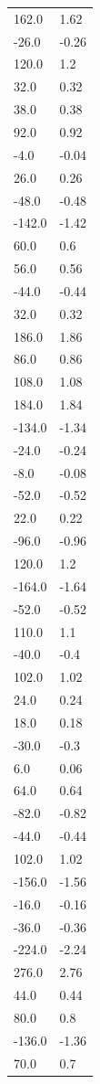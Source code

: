 \begin{longtable}{ll}
162.0 & 1.62 \\
-26.0 & -0.26 \\
120.0 & 1.2 \\
32.0 & 0.32 \\
38.0 & 0.38 \\
92.0 & 0.92 \\
-4.0 & -0.04 \\
26.0 & 0.26 \\
-48.0 & -0.48 \\
-142.0 & -1.42 \\
60.0 & 0.6 \\
56.0 & 0.56 \\
-44.0 & -0.44 \\
32.0 & 0.32 \\
186.0 & 1.86 \\
86.0 & 0.86 \\
108.0 & 1.08 \\
184.0 & 1.84 \\
-134.0 & -1.34 \\
-24.0 & -0.24 \\
-8.0 & -0.08 \\
-52.0 & -0.52 \\
22.0 & 0.22 \\
-96.0 & -0.96 \\
120.0 & 1.2 \\
-164.0 & -1.64 \\
-52.0 & -0.52 \\
110.0 & 1.1 \\
-40.0 & -0.4 \\
102.0 & 1.02 \\
24.0 & 0.24 \\
18.0 & 0.18 \\
-30.0 & -0.3 \\
6.0 & 0.06 \\
64.0 & 0.64 \\
-82.0 & -0.82 \\
-44.0 & -0.44 \\
102.0 & 1.02 \\
-156.0 & -1.56 \\
-16.0 & -0.16 \\
-36.0 & -0.36 \\
-224.0 & -2.24 \\
276.0 & 2.76 \\
44.0 & 0.44 \\
80.0 & 0.8 \\
-136.0 & -1.36 \\
70.0 & 0.7 \\

\end{longtable}
